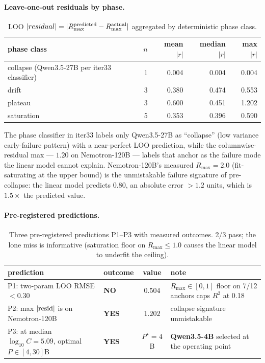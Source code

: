 \paragraph{Leave-one-out residuals by phase.}
\begin{table}[ht]
\centering\small
\begin{tabular}{lrrrr}
\toprule
phase class & $n$ & mean $|r|$ & median $|r|$ & max $|r|$ \\
\midrule
 collapse (Qwen3.5-27B per iter33 classifier) & 1 & 0.004 & 0.004 & 0.004 \\
 drift  & 3 & 0.380 & 0.474 & 0.553 \\
 plateau & 3 & 0.600 & 0.451 & 1.202 \\
 saturation & 5 & 0.353 & 0.396 & 0.590 \\
\bottomrule
\end{tabular}
\caption{LOO $|residual|=|R_{\max}^{\rm predicted}-R_{\max}^{\rm actual}|$ aggregated by deterministic phase class.}
\end{table}

The phase classifier in iter33 labels only Qwen3.5-27B as ``collapse'' (low variance early-failure pattern) with a near-perfect LOO prediction, while the columnwise-residual max --- $1.20$ on Nemotron-120B --- labels that anchor as the failure mode the linear model cannot explain. Nemotron-120B's measured $R_{\max}=2.0$ (fit-saturating at the upper bound) is the unmistakable failure signature of pre-collapse: the linear model predicts $0.80$, an absolute error $>1.2$ units, which is $1.5\times$ the predicted value.

\paragraph{Pre-registered predictions.}
\begin{table}[ht]
\centering\small
\begin{tabular}{llcl}
\toprule
prediction & outcome & value & note \\
\midrule
 P1: two-param LOO RMSE $< 0.30$ & \textbf{NO}  & $0.504$ & $R_{\max}\in[0,1]$ floor on 7/12 anchors caps $R^2$ at 0.18 \\
 P2: max $|{\rm resid}|$ is on Nemotron-120B & \textbf{YES} & $1.202$ & collapse signature unmistakable \\
 P3: at median $\log_{10}C=5.09$, optimal $P\in[4,30]$B & \textbf{YES} & $P^{\star}=4$B & \textbf{Qwen3.5-4B} selected at the operating point \\
\bottomrule
\end{tabular}
\caption{Three pre-registered predictions P1--P3 with measured outcomes. 2/3 pass; the lone miss is informative (saturation floor on $R_{\max}\le 1.0$ causes the linear model to underfit the ceiling).}
\end{table}

